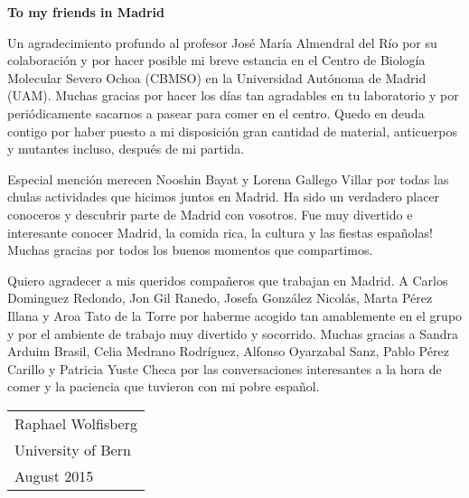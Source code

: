 \begin{addmargin}{0.025\textwidth}
\newpage
\noindent 
\Large\textbf{To my friends in Madrid}

\normalsize
\par\bigskip
\noindent 
Un agradecimiento profundo al profesor José María Almendral del Río por su colaboración y por hacer posible mi breve estancia en el Centro de Biología Molecular Severo Ochoa (CBMSO) en la Universidad Autónoma de Madrid (UAM). Muchas gracias por hacer los días tan agradables en tu laboratorio y por periódicamente sacarnos a pasear para comer en el centro. Quedo en deuda contigo por haber puesto a mi disposición gran cantidad de material, anticuerpos y mutantes incluso, después de mi partida.

\par\medskip 
\noindent
Especial mención merecen Nooshin Bayat y Lorena Gallego Villar por todas las chulas actividades que hicimos juntos en Madrid. Ha sido un verdadero placer conoceros y descubrir parte de Madrid con vosotros. Fue muy divertido e interesante conocer Madrid, la comida rica, la cultura y las fiestas españolas! Muchas gracias por todos los buenos momentos que compartimos.
   
\par\medskip 
\noindent   
Quiero agradecer a mis queridos compañeros que trabajan en Madrid. A Carlos Dominguez Redondo, Jon Gil Ranedo, Josefa González Nicolás, Marta Pérez Illana y Aroa Tato de la Torre por haberme acogido tan amablemente en el grupo y por el ambiente de trabajo muy divertido y socorrido. Muchas gracias a Sandra Arduim Brasil, Celia Medrano Rodríguez, Alfonso Oyarzabal Sanz, Pablo Pérez Carillo y Patricia Yuste Checa por las conversaciones interesantes a la hora de comer y la paciencia que tuvieron con mi pobre español.      
\end{addmargin}

 
\par\bigskip
\par\bigskip
\par\bigskip
\par\bigskip
\noindent \hfill\begin{tabular}{l}
Raphael Wolfisberg\\
University of Bern\\
August 2015\\
\end{tabular}

